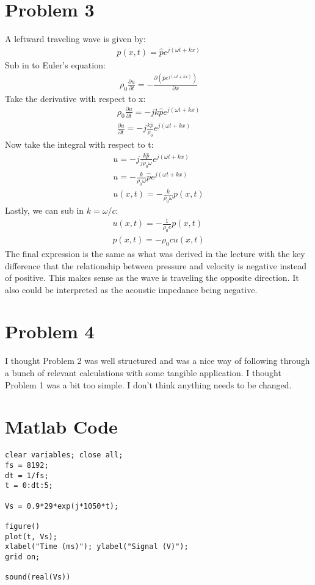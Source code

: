 \documentclass[12 pt]{article}
\begin{document}
\section*{Problem 3}
A leftward traveling wave is given by:
\begin{align*}
    p(x, t)=\hat{p}e^{j(\omega t +kx)}
\end{align*}
Sub in to Euler's equation:
\begin{align*}
    \rho_0\frac{\partial u}{\partial t}=-\frac{\partial \left(\hat{p}e^{j(\omega t +kx)}\right)}{\partial x}
\end{align*}
Take the derivative with respect to x:
\begin{align*}
    \rho_0\frac{\partial u}{\partial t}=-jk\hat{p}e^{j(\omega t + kx)} \\
    \frac{\partial u}{\partial t}=-j\frac{k\hat{p}}{\rho_0}e^{j(\omega t + kx)}
\end{align*}
Now take the integral with respect to t:
\begin{align*}
    u = -j\frac{k\hat{p}}{j\rho_0\omega}e^{j(\omega t + kx)} \\
    u = -\frac{k}{\rho_0\omega}\hat{p}e^{j(\omega t + kx)} \\
    u(x, t)=-\frac{k}{\rho_0\omega}p(x, t)
\end{align*}
Lastly, we can sub in $k=\omega/c$:
\begin{align*}
    u(x, t)=-\frac{1}{\rho_0c}p(x, t) \\
    p(x, t)=-\rho_0cu(x, t)
\end{align*}
The final expression is the same as what was derived in the lecture with the key difference that the relationship
between pressure and velocity is negative instead of positive. This makes sense as the wave is traveling the opposite
direction. It also could be interpreted as the acoustic impedance being negative.

\section*{Problem 4}
I thought Problem 2 was well structured and was a nice way of following through a bunch of relevant calculations with
some tangible application. I thought Problem 1 was a bit too simple. I don't think anything needs to be changed.

\section*{Matlab Code}
\begin{verbatim}
clear variables; close all;
fs = 8192;
dt = 1/fs;
t = 0:dt:5;

Vs = 0.9*29*exp(j*1050*t);

figure()
plot(t, Vs);
xlabel("Time (ms)"); ylabel("Signal (V)");
grid on;

sound(real(Vs))
\end{verbatim}
\end{document}
